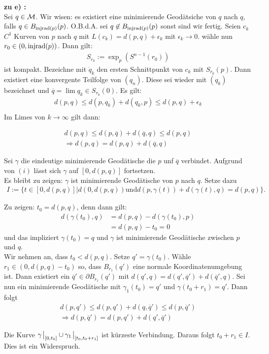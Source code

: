 \begin{bew}
\textbf{zu e) :}\\
Sei $q \in \mathcal{M}$. 
Wir wisen: es existiert eine minimierende Geodätsiche von $q$ nach $q$, 
falls $q \in B_{\operatorname{injrad} (p)} (p)$.
O.B.d.A.  sei $q \not\in B_{\operatorname{injrad} (p)} (p)$ sonst sind wir fertig.
Seien $c_k$ $C^{1}$ Kurven von $p$ nach $q$ mit 
$L(c_k) = d(p,q) + \epsilon_k$ mit $\epsilon_k \to 0$.
wähle nun $r_0 \in (0, \operatorname{injrad} (p))$.
Dann gilt:
\begin{align*}
    S_{r_0} := \exp_p (S^{n-1} (r_0))
\end{align*}
ist kompakt.
Bezeichne mit $\dot{q}_k$ den ersten Schnittpunkt von $c_k$ mit $S_{r_0} (p)$.
Dann existiert eine konvergente Teilfolge von $(q_n)$.
Diese sei wieder mit $(q_k)$ bezeichnet und $\overline{q} = \lim q_k \in S_{r_0} (0)$.
Es gilt:
\begin{align*}
    d(p,q) \leq d(p, q_k) + d(q_k , p) \leq d(p, q) + \epsilon_k\\
\end{align*}
Im Limes von $k \to \infty$ gilt dann:

\begin{align*}
    d(p,q) \leq d(p, \overline{q}) + d (\overline{q}, q) \leq d(p, q)\\
    \Rightarrow d(p, q) = d(p, q) + d(\overline{q} , q )
\end{align*}

Sei $\gamma$ die eindeutige minimierende Geodätische die $p$ unf $\overline{q}$
verbindet.
Aufgrund von $(i)$ lässt sich $\gamma$ auf $[0, d (p, q)]$ fortsetzen.\\
Es bleibt zu zeigen:
$\gamma$ ist minimierende Geodätische von $p$ nach $q$.
Setze dazu 
\begin{align*}
    I:= \{ t \in [0, d(p, q)] \vert d(0, d(p,q)) \text{und} d(p, \gamma (t) ) + d (\gamma (t) , q) = d(p, q) \} .
\end{align*}

Zu zeigen:
$t_0 = d(p,q)$, denn dann gilt:
\begin{align*}
    d(\gamma (t_0) , q) &= d(p,q) - d(\gamma (t_0), p) \\
    &= d(p,q) - t_0 = 0
\end{align*}
und das impliziert $\gamma (t_0) =q$ und $\gamma$ ist minimierende Geodätische
zwischen $p$ und $q$.\\
Wir nehmen an, dass $t_0 < d(p,q)$.
Setze $q' = \gamma (t_0)$.
Wähle $r_1 \in (0, d(p,q) -t_0)$ so, dass $B_{r_1} (q')$ eine normale 
Koordinatenumgebung ist.
Dann existiert ein $\overline{q}' \in \partial B_{r_1} (q')$ mit
$d(q', q) = d(q', \overline{q}') +  d(\overline{q}', q)$.
Sei nun ein minimierende Geodätische mit $\gamma_1 (t_0) = q'$ 
und $\gamma (t_0 + r_1) =q'$.
Dann folgt
\begin{align*}
    d(p, q') \leq d(p,q') + d(q, \overline{q}') \leq d(p,\overline{q}')\\
    \Rightarrow d(p, \overline{q}') = d(p, q' ) + d(q', \overline{q}') 
\end{align*}

Die Kurve $\gamma\eval_{[0, t_0]} \cup \gamma_1 \eval_{[t_0, t_0 + r_1]}$
ist kürzeste Verbindung.
Daraus folgt $t_0 + r_1 \in I$.
Dies ist ein Widerspruch.
\end{bew}


